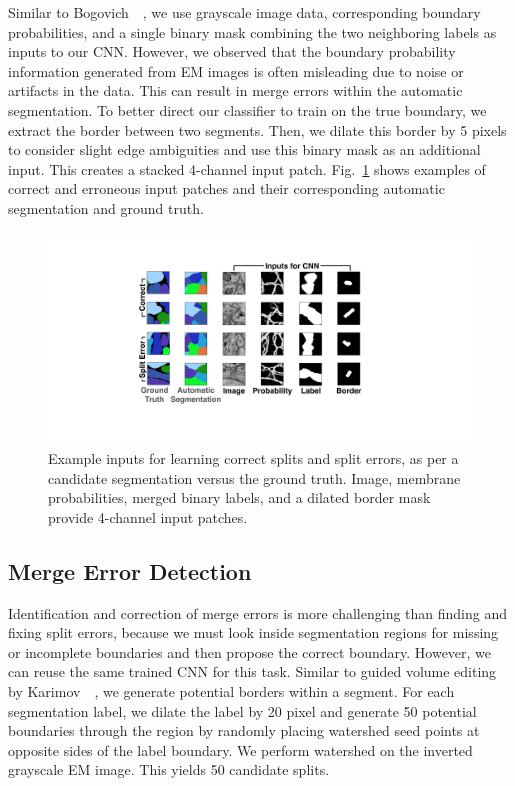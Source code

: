 Similar to Bogovich~\etal~\cite{BogovicHJ13}, we use grayscale image data,
corresponding boundary probabilities, and a single binary mask combining the two
neighboring labels as inputs to our CNN. However, we observed that the
boundary probability information generated from EM images is often misleading
due to noise or artifacts in the data. This can result in merge errors within
the automatic segmentation. To better direct our classifier to train on the true
boundary, we extract the border between two segments. Then, we dilate this border
by 5 pixels to consider slight edge ambiguities and use this binary mask as an
additional input. This creates a stacked 4-channel input patch.
Fig.~\ref{fig:cnn_inputs} shows examples of correct and erroneous input
patches and their corresponding automatic segmentation and ground truth.

\begin{figure}[t]
\begin{center}
  \includegraphics[width=\linewidth]{gfx/cnn_inputs.pdf}
\end{center}
   \caption{Example inputs for learning correct splits and split errors, as per a candidate segmentation versus the ground truth. Image, membrane probabilities, merged binary labels, and a dilated border mask provide 4-channel input patches.}
\label{fig:cnn_inputs}
\end{figure}


\subsection{Merge Error Detection}

Identification and correction of merge errors is more challenging than finding and fixing split errors, because we must look inside segmentation regions for missing or incomplete boundaries and then propose the correct boundary. However, we can reuse the same trained CNN for this task. Similar to guided volume editing by Karimov~\etal~\cite{karimov_guided_volume_editing}, we generate potential borders within a segment. For each segmentation label, we dilate the label by 20 pixel and generate 50 potential boundaries through the region by randomly placing watershed seed points at opposite sides of the label boundary. We perform watershed on the inverted grayscale EM image. This yields 50 candidate splits.

